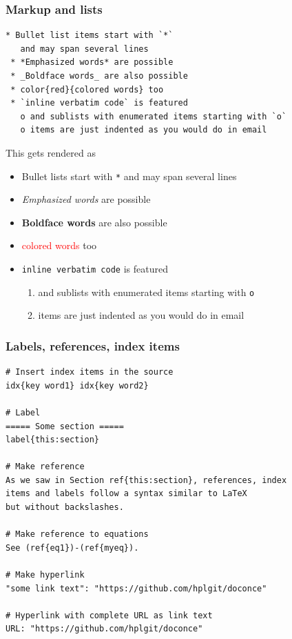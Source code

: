 \documentclass{beamer}
\newcounter{doconce:exercise:counter}
\newcounter{doconce:movie:counter}
\begin{document}
\begin{frame}
\frametitle{Markup and lists}

\begin{Verbatim}[numbers=none,fontsize=\fontsize{9pt}{9pt},baselinestretch=0.95]
 * Bullet list items start with `*`
   and may span several lines
 * *Emphasized words* are possible
 * _Boldface words_ are also possible
 * color{red}{colored words} too
 * `inline verbatim code` is featured
   o and sublists with enumerated items starting with `o`
   o items are just indented as you would do in email
\end{Verbatim}

This gets rendered as

\begin{itemize}
 \item Bullet lists start with \Verb!*!
   and may span several lines

 \item \emph{Emphasized words} are possible

 \item \textbf{Boldface words} are also possible

 \item \textcolor{red}{colored words} too

 \item \Verb!inline verbatim code! is featured
\begin{enumerate}

  \item and sublists with enumerated items starting with \Verb!o!

  \item items are just indented as you would do in email
\end{enumerate}

\noindent
\end{itemize}

\noindent
\end{frame}

\begin{frame}
\frametitle{Labels, references, index items}

\begin{Verbatim}[numbers=none,fontsize=\fontsize{9pt}{9pt},baselinestretch=0.95]
# Insert index items in the source
idx{key word1} idx{key word2}

# Label
===== Some section =====
label{this:section}

# Make reference
As we saw in Section ref{this:section}, references, index
items and labels follow a syntax similar to LaTeX
but without backslashes.

# Make reference to equations
See (ref{eq1})-(ref{myeq}).

# Make hyperlink
"some link text": "https://github.com/hplgit/doconce"

# Hyperlink with complete URL as link text
URL: "https://github.com/hplgit/doconce"
\end{Verbatim}
\end{frame}
\end{document}
